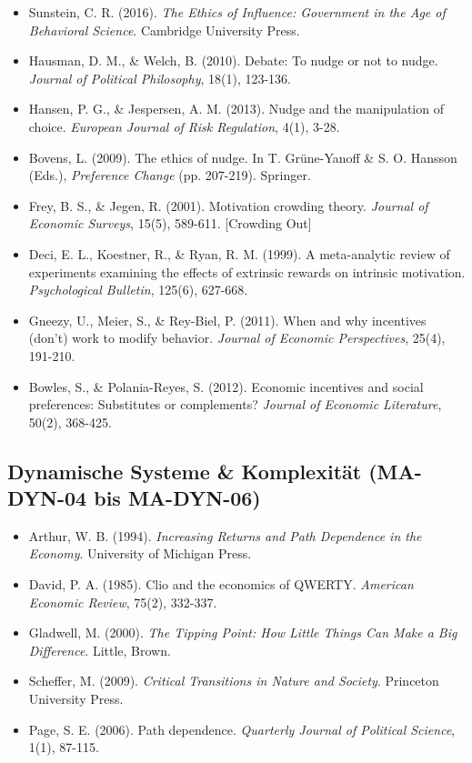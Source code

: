 \begin{itemize}[leftmargin=*]
    \item Sunstein, C. R. (2016). \textit{The Ethics of Influence: Government in the Age of Behavioral Science}. Cambridge University Press.
    \item Hausman, D. M., \& Welch, B. (2010). Debate: To nudge or not to nudge. \textit{Journal of Political Philosophy}, 18(1), 123-136.
    \item Hansen, P. G., \& Jespersen, A. M. (2013). Nudge and the manipulation of choice. \textit{European Journal of Risk Regulation}, 4(1), 3-28.
    \item Bovens, L. (2009). The ethics of nudge. In T. Grüne-Yanoff \& S. O. Hansson (Eds.), \textit{Preference Change} (pp. 207-219). Springer.
    \item Frey, B. S., \& Jegen, R. (2001). Motivation crowding theory. \textit{Journal of Economic Surveys}, 15(5), 589-611. [Crowding Out]
    \item Deci, E. L., Koestner, R., \& Ryan, R. M. (1999). A meta-analytic review of experiments examining the effects of extrinsic rewards on intrinsic motivation. \textit{Psychological Bulletin}, 125(6), 627-668.
    \item Gneezy, U., Meier, S., \& Rey-Biel, P. (2011). When and why incentives (don't) work to modify behavior. \textit{Journal of Economic Perspectives}, 25(4), 191-210.
    \item Bowles, S., \& Polania-Reyes, S. (2012). Economic incentives and social preferences: Substitutes or complements? \textit{Journal of Economic Literature}, 50(2), 368-425.
\end{itemize}

\subsection*{Dynamische Systeme \& Komplexität (MA-DYN-04 bis MA-DYN-06)}

\begin{itemize}[leftmargin=*]
    \item Arthur, W. B. (1994). \textit{Increasing Returns and Path Dependence in the Economy}. University of Michigan Press.
    \item David, P. A. (1985). Clio and the economics of QWERTY. \textit{American Economic Review}, 75(2), 332-337.
    \item Gladwell, M. (2000). \textit{The Tipping Point: How Little Things Can Make a Big Difference}. Little, Brown.
    \item Scheffer, M. (2009). \textit{Critical Transitions in Nature and Society}. Princeton University Press.
    \item Page, S. E. (2006). Path dependence. \textit{Quarterly Journal of Political Science}, 1(1), 87-115.
\end{itemize}

